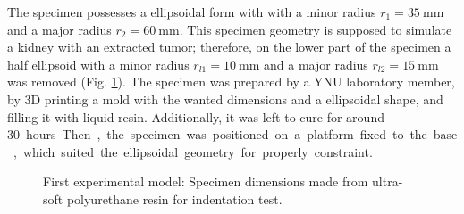The specimen possesses a ellipsoidal form with 
with a minor radius $r_1 = \SI{35}{\milli \m}$ and a major radius $r_2 = \SI{60}{\milli \m}$. 
This specimen geometry is supposed to simulate a kidney with an extracted tumor; therefore,
on the lower part of the specimen a half ellipsoid with a minor radius $r_{l1} = \SI{10}{\milli \m}$ 
and a major radius $r_{l2} = \SI{15}{\milli \m}$ was removed (Fig. \ref{fig:specimenhole}). 
The specimen was prepared by a YNU laboratory member, by 3D printing a mold with the wanted dimensions
 and a ellipsoidal shape, and filling it with liquid resin. 
 Additionally, it was left to cure for around \SI{30} hours. 
Then, the specimen was positioned on a platform fixed to the base, which suited 
the ellipsoidal geometry for properly constraint. 

\begin{figure}%
    \centering
   \qquad
   \caption{First experimental model: Specimen dimensions made from ultra-soft polyurethane resin for indentation test.}%
   \label{fig:specimenhole}%
\end{figure}

